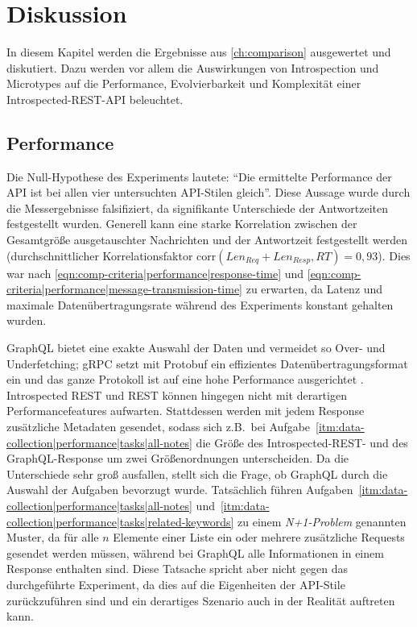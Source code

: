 \chapter{Diskussion}\label{ch:discussion}

In diesem Kapitel werden die Ergebnisse aus \cref{ch:comparison} ausgewertet und diskutiert. Dazu werden vor allem die Auswirkungen von Introspection und Microtypes auf die Performance, Evolvierbarkeit und Komplexität einer Introspected-REST-API beleuchtet.

\section{Performance}\label{sec:discussion|performance}

Die Null-Hypothese des Experiments lautete: \enquote{Die ermittelte Performance der API ist bei allen vier untersuchten API-Stilen gleich}. Diese Aussage wurde durch die Messergebnisse falsifiziert, da signifikante Unterschiede der Antwortzeiten festgestellt wurden. Generell kann eine starke Korrelation zwischen der Gesamtgröße ausgetauschter Nachrichten und der Antwortzeit festgestellt werden (durchschnittlicher Korrelationsfaktor \(\text{corr}(\mathit{Len}_{\mathit{Req}} + \mathit{Len}_{\mathit{Resp}}, RT) = 0,93\)). Dies war nach \eqref{eqn:comp-criteria|performance|response-time} und \eqref{eqn:comp-criteria|performance|message-transmission-time} zu erwarten, da Latenz und maximale Datenübertragungsrate während des Experiments konstant gehalten wurden.

GraphQL bietet eine exakte Auswahl der Daten und vermeidet so Over- und Underfetching; gRPC setzt mit Protobuf ein effizientes Datenübertragungsformat ein und das ganze Protokoll ist auf eine hohe Performance ausgerichtet \autocite{gRPC_About}. Introspected REST und REST können hingegen nicht mit derartigen Performancefeatures aufwarten. Stattdessen werden mit jedem Response zusätzliche Metadaten gesendet, sodass sich z.B.\ bei Aufgabe~\ref{itm:data-collection|performance|tasks|all-notes} die Größe des Introspected-REST- und des GraphQL-Response um zwei Größenordnungen unterscheiden. Da die Unterschiede sehr groß ausfallen, stellt sich die Frage, ob GraphQL durch die Auswahl der Aufgaben bevorzugt wurde. Tatsächlich führen Aufgaben~\ref{itm:data-collection|performance|tasks|all-notes} und~\ref{itm:data-collection|performance|tasks|related-keywords} zu einem \emph{N+1-Problem} genannten Muster, da für alle \(n\) Elemente einer Liste ein oder mehrere zusätzliche Requests gesendet werden müssen, während bei GraphQL alle Informationen in einem Response enthalten sind. Diese Tatsache spricht aber nicht gegen das durchgeführte Experiment, da dies auf die Eigenheiten der API-Stile zurückzuführen sind und ein derartiges Szenario auch in der Realität auftreten kann.

